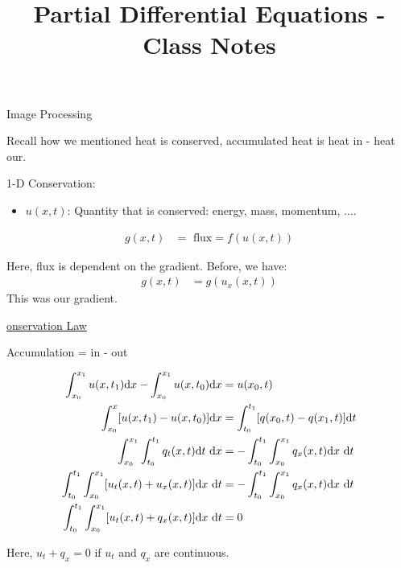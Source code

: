 \documentclass{article}
\title{Partial Differential Equations - Class Notes} %
\begin{document}
\maketitle
\newpage

{Image Processing}

Recall how we mentioned heat is conserved, accumulated heat is heat in - heat our.

1-D Conservation:
\begin{itemize}
  \item $u(x, t)$: Quantity that is conserved: energy, mass, momentum, $\ldots$.
\end{itemize}
  \begin{align}
    g(x, t) & = \text{ flux} = f(u(x, t))
  \end{align}

  Here, flux is dependent on the gradient. Before, we have:
  \begin{align}
    g(x, t) & = g(u_x(x, t))
  \end{align}
  This was our gradient.

  \underline{onservation Law}

  \begin{center}
    Accumulation = in - out
  \end{center}
  \begin{align}
    \int^{x_1}_{x_0} u(x, t_1) \text dx - \int^{x_1}_{x_0} u(x, t_0) \text dx
    & = u(x_0, t)\\
    \int^x_{x_0} [u(x, t_1) - u(x, t_0)] \text dx
    & = \int^{t_1}_{t_0} [ q(x_0, t) - q(x_1, t)] \text dt\\
    \int^{x_1}_{x_0} \int^{t_1}_{t_0} q_t(x, t) \text dt\ \text dx
    & = - \int^{t_1}_{t_0} \int^{x_1}_{x_0} q_x(x, t) \text dx\ \text dt\\
    \int^{t_1}_{t_0} \int^{x_1}_{x_0} [u_t(x, t) + u_x(x, t)] \text dx\ \text dt
    & = -\int^{t_1}_{t_0} \int^{x_1}_{x_0} q_x(x, t) \text dx\ \text dt\\
    \int^{t_1}_{t_0} \int^{x_1}_{x_0} [u_t(x, t) + q_x(x, t)] \text dx\ \text dt & = 0
  \end{align}

  Here, $u_t + q_x = 0$ if $u_t$ and $q_x$ are continuous.
\end{document}
